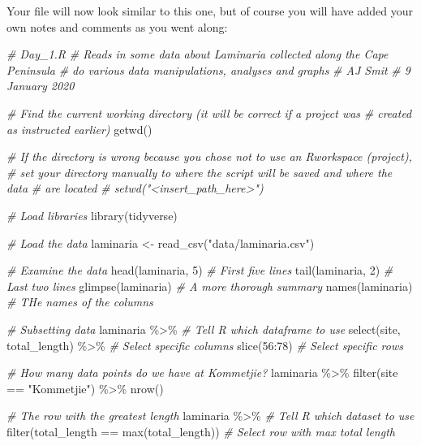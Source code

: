 \documentclass[
]{book}
\newenvironment{Shaded}{\begin{snugshade}}{\end{snugshade}}
\newcommand{\CommentTok}[1]{\textcolor[rgb]{0.56,0.35,0.01}{\textit{#1}}}
\newcommand{\DecValTok}[1]{\textcolor[rgb]{0.00,0.00,0.81}{#1}}
\newcommand{\FunctionTok}[1]{\textcolor[rgb]{0.00,0.00,0.00}{#1}}
\newcommand{\NormalTok}[1]{#1}
\newcommand{\OtherTok}[1]{\textcolor[rgb]{0.56,0.35,0.01}{#1}}
\newcommand{\SpecialCharTok}[1]{\textcolor[rgb]{0.00,0.00,0.00}{#1}}
\newcommand{\StringTok}[1]{\textcolor[rgb]{0.31,0.60,0.02}{#1}}
\begin{document}
Your file will now look similar to this one, but of course you will have added your own notes and comments as you went along:

\begin{Shaded}
\begin{Highlighting}[]
\CommentTok{\# Day\_1.R}
\CommentTok{\# Reads in some data about Laminaria collected along the Cape Peninsula}
\CommentTok{\# do various data manipulations, analyses and graphs}
\CommentTok{\# AJ Smit}
\CommentTok{\# 9 January 2020}

\CommentTok{\# Find the current working directory (it will be correct if a project was}
\CommentTok{\# created as instructed earlier)}
\FunctionTok{getwd}\NormalTok{()}

\CommentTok{\# If the directory is wrong because you chose not to use an Rworkspace (project),}
\CommentTok{\# set your directory manually to where the script will be saved and where the data}
\CommentTok{\# are located}
\CommentTok{\# setwd("\textless{}insert\_path\_here\textgreater{}")}

\CommentTok{\# Load libraries}
\FunctionTok{library}\NormalTok{(tidyverse)}

\CommentTok{\# Load the data}
\NormalTok{laminaria }\OtherTok{\textless{}{-}} \FunctionTok{read\_csv}\NormalTok{(}\StringTok{"data/laminaria.csv"}\NormalTok{)}

\CommentTok{\# Examine the data}
\FunctionTok{head}\NormalTok{(laminaria, }\DecValTok{5}\NormalTok{) }\CommentTok{\# First five lines}
\FunctionTok{tail}\NormalTok{(laminaria, }\DecValTok{2}\NormalTok{) }\CommentTok{\# Last two lines}
\FunctionTok{glimpse}\NormalTok{(laminaria) }\CommentTok{\# A more thorough summary}
\FunctionTok{names}\NormalTok{(laminaria) }\CommentTok{\# THe names of the columns}

\CommentTok{\# Subsetting data}
\NormalTok{laminaria }\SpecialCharTok{\%\textgreater{}\%} \CommentTok{\# Tell R which dataframe to use}
  \FunctionTok{select}\NormalTok{(site, total\_length) }\SpecialCharTok{\%\textgreater{}\%} \CommentTok{\# Select specific columns}
  \FunctionTok{slice}\NormalTok{(}\DecValTok{56}\SpecialCharTok{:}\DecValTok{78}\NormalTok{) }\CommentTok{\# Select specific rows}

\CommentTok{\# How many data points do we have at Kommetjie?}
\NormalTok{laminaria }\SpecialCharTok{\%\textgreater{}\%}
  \FunctionTok{filter}\NormalTok{(site }\SpecialCharTok{==} \StringTok{"Kommetjie"}\NormalTok{) }\SpecialCharTok{\%\textgreater{}\%}
  \FunctionTok{nrow}\NormalTok{()}

\CommentTok{\# The row with the greatest length}
\NormalTok{laminaria }\SpecialCharTok{\%\textgreater{}\%} \CommentTok{\# Tell R which dataset to use}
  \FunctionTok{filter}\NormalTok{(total\_length }\SpecialCharTok{==} \FunctionTok{max}\NormalTok{(total\_length)) }\CommentTok{\# Select row with max total length}
\end{Highlighting}
\end{Shaded}
\end{document}
